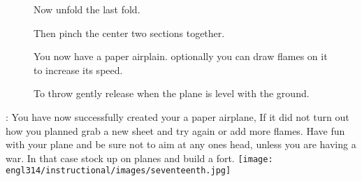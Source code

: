 \documentclass[12pt]{article}
\newcommand\head[1]{\noindent{\large\textbf{#1}}:\newline}
\begin{document}
\begin{figure}[!h]
  \centering
  \caption{Now unfold the last fold.}
  \qquad
\end{figure}

\begin{figure}[!t]
  \centering
  \caption{Then pinch the center two sections together.}
  \qquad
\end{figure}

\begin{figure}[!h]
  \centering
  \caption{You now have a paper airplain. optionally you can draw flames on it to increase its speed.}
  \qquad
\end{figure}

\begin{figure}[!t]
  \centering
  \caption{To throw gently release when the plane is level with the ground.}
  \qquad
\end{figure}

\vspace{\baselineskip}

\head{Conclusion}
\indent You have now successfully created your a paper airplane, If it did not turn out how you planned grab a new sheet and try again or add more flames.
 Have fun with your plane and be sure not to aim at any ones head, unless you are having a war. In that case stock up on planes and build a fort.
 \center\texttt{[image: engl314/instructional/images/seventeenth.jpg]}
\end{document}
